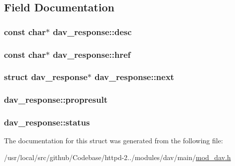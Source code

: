 \subsection{Field Documentation}
\subsubsection[{\texorpdfstring{desc}{desc}}]{\setlength{\rightskip}{0pt plus 5cm}const char$\ast$ dav\+\_\+response\+::desc}\hypertarget{structdav__response_ab6f18a6e053b1d8573a73a2bdc574b47}{}\label{structdav__response_ab6f18a6e053b1d8573a73a2bdc574b47}
\subsubsection[{\texorpdfstring{href}{href}}]{\setlength{\rightskip}{0pt plus 5cm}const char$\ast$ dav\+\_\+response\+::href}\hypertarget{structdav__response_af47dec46cb0ceb183f37cc80f88ca1cb}{}\label{structdav__response_af47dec46cb0ceb183f37cc80f88ca1cb}
\subsubsection[{\texorpdfstring{next}{next}}]{\setlength{\rightskip}{0pt plus 5cm}struct {\bf dav\+\_\+response}$\ast$ dav\+\_\+response\+::next}\hypertarget{structdav__response_abe3d46f02938b45865ccf10e228b5a38}{}\label{structdav__response_abe3d46f02938b45865ccf10e228b5a38}
\subsubsection[{\texorpdfstring{propresult}{propresult}}]{ dav\+\_\+response\+::propresult}\hypertarget{structdav__response_a4dde6c59f8785f50dbda7c5fca30bdda}{}\label{structdav__response_a4dde6c59f8785f50dbda7c5fca30bdda}
\subsubsection[{\texorpdfstring{status}{status}}]{ dav\+\_\+response\+::status}\hypertarget{structdav__response_a1f3a9d628d4b90ac90fb11c34d0286a0}{}\label{structdav__response_a1f3a9d628d4b90ac90fb11c34d0286a0}


The documentation for this struct was generated from the following file\+:\begin{DoxyCompactItemize}
\item 
/usr/local/src/github/\+Codebase/httpd-\/2../modules/dav/main/\hyperlink{mod__dav_8h}{mod\+\_\+dav.\+h}\end{DoxyCompactItemize}
